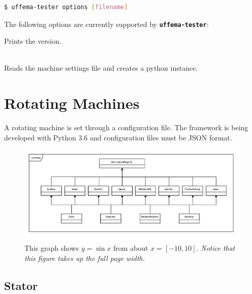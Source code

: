 \documentclass{tufte-book} %
\begin{document}
\begin{lstlisting}[language=bash]
$ uffema-tester options [filename]
\end{lstlisting}

The following options are currently supported by \textbf{\texttt{uffema-tester}}:
 \begin{description}[leftmargin=1cm, style=nextline]
\item  \item [{\normalfont\ttfamily{\textbf{-v}}}]  \hfil \newline Prints the version.
 \item [{\normalfont\ttfamily{\textbf{-f}}}]  {} \\ Reads the machine settings file and creates a python instance. 					
 \end{description}


\chapter{Rotating Machines}
\label{ch:1}

A rotating machine is set through a configuration file. The framework is being developed with Python 3.6 and configuration files must be JSON format. 

\begin{figure}[h]
\includegraphics[width=\linewidth]{PermanentMagnet.pdf}
\caption{This graph shows $y = \sin x$ from about $x = [-10, 10]$.
\emph{Notice that this figure takes up the full page width.}}
\label{fig:fullfig}
\end{figure}

\section{Stator}
\end{document}
